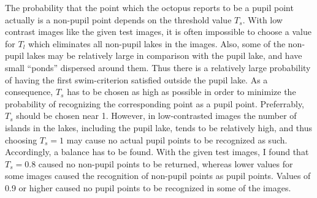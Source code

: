 The probability that the point which the octopus reports to be a pupil
point actually is a non-pupil point depends on the threshold value
$T_{s}$.  With low contrast images like the given test images, it is
often impossible to choose a value for $T_{l}$ which eliminates all
non-pupil lakes in the images.  Also, some of the non-pupil lakes may
be relatively large in comparison with the pupil lake, and have small
``ponds'' dispersed around them.  Thus there is a relatively large
probability of having the first swim-criterion satisfied outside the
pupil lake.  As a consequence, $T_{s}$ has to be chosen as high as
possible in order to minimize the probability of recognizing the
corresponding point as a pupil point.  Preferrably, $T_{s}$ should be
chosen near 1.  However, in low-contrasted images the number of
islands in the lakes, including the pupil lake, tends to be relatively
high, and thus choosing $T_{s}=1$ may cause no actual pupil points to
be recognized as such.  Accordingly, a balance has to be found.  With
the given test images, I found that $T_{s}=0.8$ caused no non-pupil
points to be returned, whereas lower values for some images caused the
recognition of non-pupil points as pupil points.  Values of 0.9 or
higher caused no pupil points to be recognized in some of the images.

